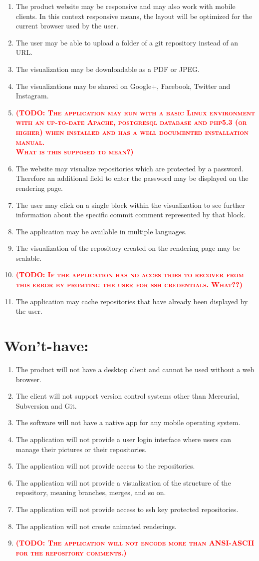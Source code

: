 \documentclass[12pt]{scrartcl}
\newcommand{\todo}[1]{\textbf{\textsc{\textcolor{red}{(TODO: #1)}}}}
\begin{document}
\begin{enumerate}
\item The product website may be responsive and may also work with mobile clients. In this context responsive means, the layout will be optimized for the current browser used by the user.
\item The user may be able to upload a folder of a git repository instead of an URL.
\item The visualization may be downloadable as a PDF or JPEG.
\item The visualizations may be shared on Google+, Facebook, Twitter and Instagram.
\item \todo{ The application may run with a basic Linux environment with an up-to-date Apache, postgresql database and php5.3 (or higher) when installed and has a well documented installation manual.\\ What is this supposed to mean?}
\item The website may visualize repositories which are protected by a password. Therefore an additional field to enter the password may be displayed on the rendering page.
\item The user may click on a single block within the visualization to see further information about the specific commit comment represented by that block.
\item The application may be available in multiple languages.
\item The visualization of the repository created on the rendering page may be scalable.
\item \todo{ If the application has no acces tries to recover from this error by promting the user for ssh credentials. What??}
\item The application may cache repositories that have already been displayed by the user.
\end{enumerate}
\section{Won't-have:}
\begin{enumerate}
\item The product will not have a desktop client and cannot be used without a web browser.
\item The client will not support version control systems other than Mercurial, Subversion and Git.
\item The software will not have a native app for any mobile operating system.
\item The application will not provide a user login interface where users can manage their pictures or their repositories.
\item The application will not provide access to the repositories.
\item The application will not provide a visualization of the structure of the repository, meaning branches, merges, and so on.
\item The application will not provide access to ssh key protected repositories.
\item The application will not create animated renderings.
\item \todo{ The application will not encode more than ANSI-ASCII for the repository comments.}
\end{enumerate}
\end{document}

